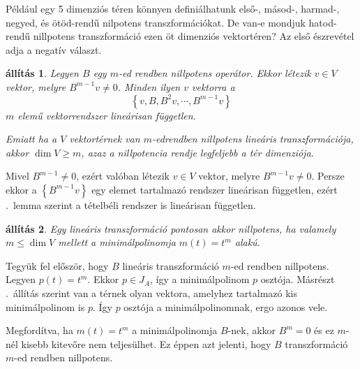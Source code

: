 \documentclass[9pt, a4paper, showtrims]{memoir}
\makeatletter
\renewenvironment{proof}[1][\proofname]
    {\par\pushQED{\qed}%
    \normalfont \topsep6\p@\@plus6\p@\relax
    \trivlist
    \item[\hskip\labelsep
        \itshape
    #1\@addpunct{:}]\ignorespaces}
    {\popQED\endtrivlist\@endpefalse}
\theoremstyle{plain}
\newtheorem{proposition}{állítás}[chapter]
\theoremstyle{remark}
\theoremstyle{definition}
\makeatother
\begin{document}
Például egy 5 dimenziós téren könnyen definiálhatunk első-, másod-, harmad-, negyed, és ötöd-rendű nilpotens transzformációkat.
De van-e mondjuk hatod-rendű nillpotens transzformáció ezen öt dimenziós vektortéren?
Az első észrevétel adja a negatív választ.
\begin{proposition}
    Legyen $B$ egy $m$-ed rendben nillpotens operátor.
    Ekkor létezik $v\in V$ vektor, 
    melyre $B^{m-1}v\neq 0$.
    Minden ilyen $v$ vektorra a
    \[
        \left\{ v,B,B^2v,\cdots,B^{m-1}v \right\}
    \]
    $m$ elemű vektorrendszer lineárisan független.

    Emiatt ha a $V$ vektortérnek van $m$-edrendben nillpotens lineáris transzformációja, akkor $\dim V\geq m$,
    azaz a nillpotencia rendje legfeljebb a tér dimenziója.
    \label{th:fgtlen}
\end{proposition}
\begin{proof}
    Mivel $B^{m-1}\neq 0$, ezért valóban létezik $v\in V$ vektor,
    melyre $B^{m-1}v\neq 0$.
    Persze ekkor a $\left\{ B^{m-1}v \right\}$ egy elemet tartalmazó rendszer lineárisan független,
    ezért .~lemma szerint a tételbéli rendszer is lineárisan független.
\end{proof}
\begin{proposition}
    Egy lineáris transzformáció pontosan akkor nillpotens, 
    ha valamely $m\leq\dim V$ mellett a minimálpolinomja
    $m\left( t \right)=t^m$ alakú.
\end{proposition}
\begin{proof}
    Tegyük fel először, hogy $B$ lineáris transzformáció $m$-ed rendben 
    nillpotens.
    Legyen $p\left( t \right)=t^m$.
    Ekkor $p\in J_A$, így a minimálpolinom $p$ osztója.
    Másrészt .~állítás szerint van a térnek olyan vektora,
    amelyhez tartalmazó kis minimálpolinom is $p$.
    Így $p$ osztója a minimálpolinomnak, ergo azonos vele.

    Megfordítva, ha $m\left( t \right)=t^m$ a minimálpolinomja $B$-nek,
    akkor $B^m=0$ és ez $m$-nél kisebb kitevőre nem teljesülhet.
    Ez éppen azt jelenti, hogy $B$ transzformáció $m$-ed rendben nillpotens.
\end{proof}
\end{document}
